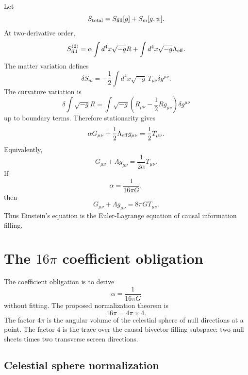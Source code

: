 \documentclass[11pt]{article}
\begin{document}
Let
\begin{equation}
S_{\rm total}=S_{\rm fill}[g]+S_m[g,\psi].
\end{equation}
At two-derivative order,
\begin{equation}
S_{\rm fill}^{(2)}=\alpha\int d^4x\sqrt{-g}R+\int d^4x\sqrt{-g}\Lambda_{\rm eff}.
\end{equation}
The matter variation defines
\begin{equation}
\delta S_m=-\frac12\int d^4x\sqrt{-g}\,T_{\mu\nu}\delta g^{\mu\nu}.
\end{equation}
The curvature variation is
\begin{equation}
\delta\int\sqrt{-g}R=\int\sqrt{-g}\left(R_{\mu\nu}-\frac12Rg_{\mu\nu}\right)\delta g^{\mu\nu}
\end{equation}
up to boundary terms. Therefore stationarity gives
\begin{equation}
\alpha G_{\mu\nu}+\frac12\Lambda_{\rm eff}g_{\mu\nu}=\frac12T_{\mu\nu}.
\end{equation}
Equivalently,
\begin{equation}
G_{\mu\nu}+\Lambda g_{\mu\nu}=\frac{1}{2\alpha}T_{\mu\nu}.
\end{equation}
If
\begin{equation}
\alpha=\frac{1}{16\pi G},
\end{equation}
then
\begin{equation}
\boxed{G_{\mu\nu}+\Lambda g_{\mu\nu}=8\pi G T_{\mu\nu}.}
\end{equation}
Thus Einstein's equation is the Euler-Lagrange equation of causal information filling.

\section{The $16\pi$ coefficient obligation}

The coefficient obligation is to derive
\begin{equation}
\alpha=\frac{1}{16\pi G}
\end{equation}
without fitting. The proposed normalization theorem is
\begin{equation}
\boxed{16\pi=4\pi\times4.}
\end{equation}
The factor $4\pi$ is the angular volume of the celestial sphere of null directions at a point. The factor $4$ is the trace over the causal bivector filling subspace: two null sheets times two transverse screen directions.

\subsection{Celestial sphere normalization}
\end{document}

